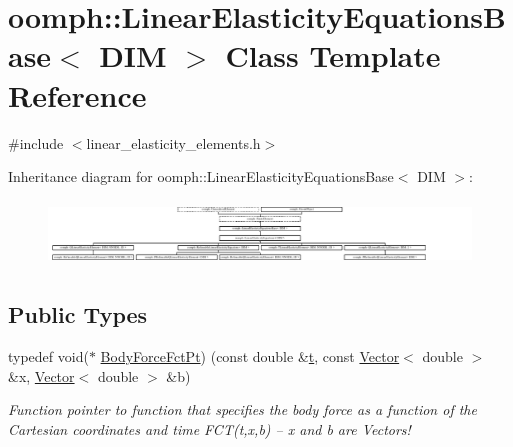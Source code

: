 \hypertarget{classoomph_1_1LinearElasticityEquationsBase}{}\section{oomph\+:\+:Linear\+Elasticity\+Equations\+Base$<$ D\+IM $>$ Class Template Reference}
\label{classoomph_1_1LinearElasticityEquationsBase}


{\ttfamily \#include $<$linear\+\_\+elasticity\+\_\+elements.\+h$>$}

Inheritance diagram for oomph\+:\+:Linear\+Elasticity\+Equations\+Base$<$ D\+IM $>$\+:\begin{figure}[H]
\begin{center}
\leavevmode
\includegraphics[height=1.736434cm]{classoomph_1_1LinearElasticityEquationsBase}
\end{center}
\end{figure}
\subsection*{Public Types}
\begin{DoxyCompactItemize}
\item 
typedef void($\ast$ \hyperlink{classoomph_1_1LinearElasticityEquationsBase_ada2fc7aa2569c35e28982f93a0749903}{Body\+Force\+Fct\+Pt}) (const double \&\hyperlink{cfortran_8h_af6f0bd3dc13317f895c91323c25c2b8f}{t}, const \hyperlink{classoomph_1_1Vector}{Vector}$<$ double $>$ \&x, \hyperlink{classoomph_1_1Vector}{Vector}$<$ double $>$ \&b)
\begin{DoxyCompactList}\small\item\em Function pointer to function that specifies the body force as a function of the Cartesian coordinates and time F\+C\+T(t,x,b) -- x and b are Vectors! \end{DoxyCompactList}\end{DoxyCompactItemize}

